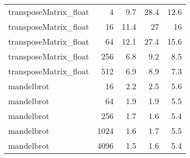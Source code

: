 \begin{tabular}{lrrrr}
 transposeMatrix\_float  &      4 &                 9.7 &              28.4 &                12.6 \\
 transposeMatrix\_float  &     16 &                11.4 &              27   &                16   \\
 transposeMatrix\_float  &     64 &                12.1 &              27.4 &                15.6 \\
 transposeMatrix\_float  &    256 &                 6.8 &               9.2 &                 8.5 \\
 transposeMatrix\_float  &    512 &                 6.9 &               8.9 &                 7.3 \\
 mandelbrot             &     16 &                 2.2 &               2.5 &                 5.6 \\
 mandelbrot             &     64 &                 1.9 &               1.9 &                 5.5 \\
 mandelbrot             &    256 &                 1.7 &               1.6 &                 5.4 \\
 mandelbrot             &   1024 &                 1.6 &               1.7 &                 5.5 \\
 mandelbrot             &   4096 &                 1.5 &               1.6 &                 5.4 \\
\bottomrule
\end{tabular}